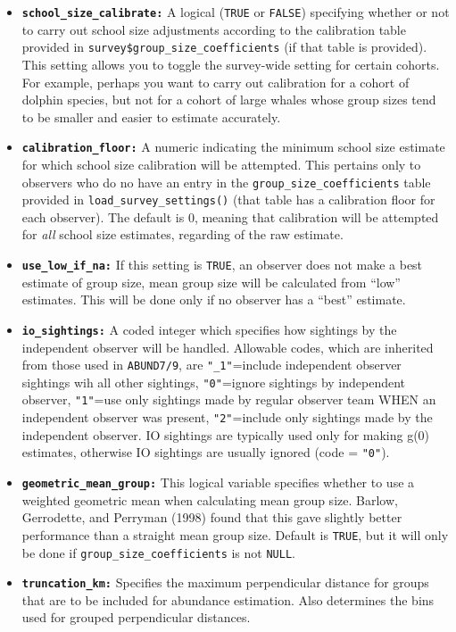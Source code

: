 \documentclass[
]{book}
\begin{document}
\begin{itemize}
\item
  \textbf{\texttt{school\_size\_calibrate:}} A logical (\texttt{TRUE} or \texttt{FALSE}) specifying whether or not to carry out school size adjustments according to the calibration table provided in \texttt{survey\$group\_size\_coefficients} (if that table is provided). This setting allows you to toggle the survey-wide setting for certain cohorts. For example, perhaps you want to carry out calibration for a cohort of dolphin species, but not for a cohort of large whales whose group sizes tend to be smaller and easier to estimate accurately.
\item
  \textbf{\texttt{calibration\_floor:}} A numeric indicating the minimum school size estimate for which school size calibration will be attempted. This pertains only to observers who do no have an entry in the \texttt{group\_size\_coefficients} table provided in \texttt{load\_survey\_settings()} (that table has a calibration floor for each observer). The default is 0, meaning that calibration will be attempted for \emph{all} school size estimates, regarding of the raw estimate.
\item
  \textbf{\texttt{use\_low\_if\_na:}} If this setting is \texttt{TRUE}, an observer does not make a best estimate of group size, mean group size will be calculated from ``low'' estimates. This will be done only if no observer has a ``best'' estimate.
\item
  \textbf{\texttt{io\_sightings:}} A coded integer which specifies how sightings by the independent observer will be handled. Allowable codes, which are inherited from those used in \texttt{ABUND7/9}, are \texttt{"\_1"}=include independent observer sightings wih all other sightings, \texttt{"0"}=ignore sightings by independent observer, \texttt{"1"}=use only sightings made by regular observer team WHEN an independent observer was present, \texttt{"2"}=include only sightings made by the independent observer. IO sightings are typically used only for making g(0) estimates, otherwise IO sightings are usually ignored (code = \texttt{"0"}).
\item
  \textbf{\texttt{geometric\_mean\_group:}} This logical variable specifies whether to use a weighted geometric mean when calculating mean group size. Barlow, Gerrodette, and Perryman (1998) found that this gave slightly better performance than a straight mean group size. Default is \texttt{TRUE}, but it will only be done if \texttt{group\_size\_coefficients} is not \texttt{NULL}.
\item
  \textbf{\texttt{truncation\_km:}} Specifies the maximum perpendicular distance for groups that are to be included for abundance estimation. Also determines the bins used for grouped perpendicular distances.

\end{itemize}
\end{document}
